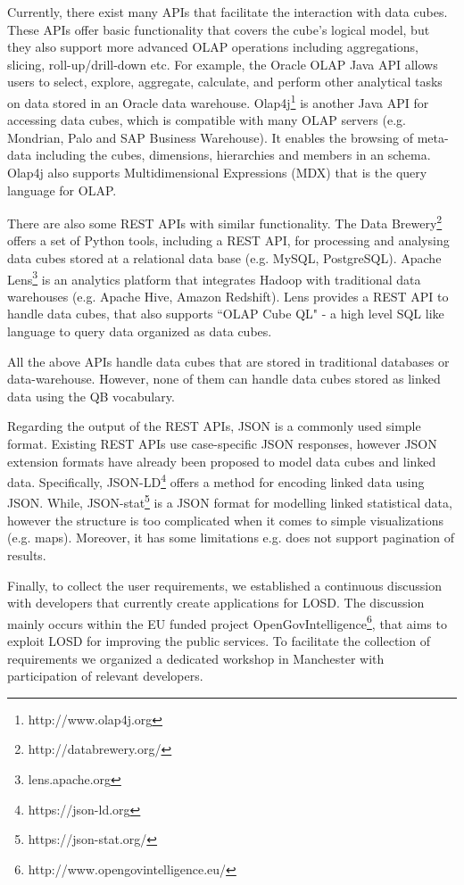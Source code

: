 \documentclass{llncs}
\begin{document}
Currently, there exist many APIs that facilitate the interaction with data cubes. These APIs offer basic functionality that covers the cube's logical model, but they also support more advanced OLAP operations including aggregations, slicing, roll-up/drill-down etc. For example, the Oracle OLAP Java API \cite{ORACLEAPI} allows users to select, explore, aggregate, calculate, and perform other analytical tasks on data stored in an Oracle data warehouse. Olap4j\footnote{http://www.olap4j.org} is another Java API for accessing data cubes, which is compatible with many OLAP servers (e.g. Mondrian, Palo and SAP Business Warehouse). It enables the browsing of meta-data including the cubes, dimensions, hierarchies and members in an schema. Olap4j also supports Multidimensional Expressions (MDX) that is the query language for OLAP.

There are also some REST APIs with similar functionality. The Data Brewery\footnote{http://databrewery.org/} offers a set of Python tools, including a REST API, for processing and analysing data cubes stored at a relational data base (e.g. MySQL, PostgreSQL). Apache Lens\footnote{lens.apache.org} is an analytics platform that integrates Hadoop with traditional data warehouses (e.g. Apache Hive, Amazon Redshift). Lens provides a REST API to handle data cubes, that also supports ``OLAP Cube QL" - a high level SQL like language to query data organized as data cubes.

All the above APIs handle data cubes that are stored in traditional databases or data-warehouse. However, none of them can handle data cubes  stored as linked data using the QB vocabulary.  

Regarding the output of the REST APIs, JSON is a commonly used simple format. Existing REST APIs use 
case-specific JSON responses, however JSON extension formats have already been proposed to model data cubes and linked data. Specifically, JSON-LD\footnote{https://json-ld.org} offers a method for encoding linked data using JSON. While, JSON-stat\footnote{https://json-stat.org/} is a JSON format for modelling linked statistical data, however the structure is too complicated when it comes to simple visualizations (e.g. maps). Moreover, it has some limitations e.g. does not support pagination of results. 

Finally, to collect the user requirements, we established a continuous discussion with developers that currently create applications for LOSD. The discussion mainly occurs within the EU funded project OpenGovIntelligence\footnote{http://www.opengovintelligence.eu/}, that aims to exploit LOSD for improving the public services. To facilitate the collection of requirements we organized a dedicated workshop in Manchester with participation of relevant developers. 
\end{document}
